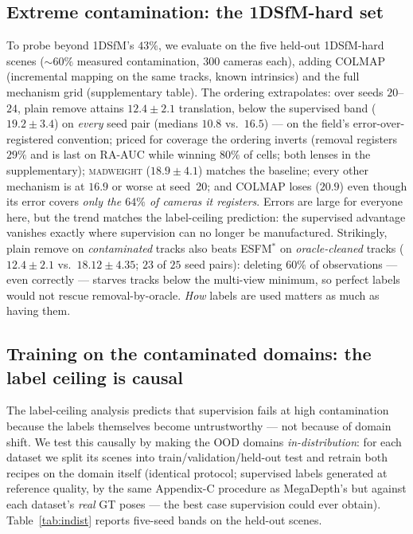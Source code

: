 \documentclass[10pt,twocolumn,letterpaper]{article}
\newcommand{\mad}{\textsc{madweight}}
\begin{document}
\subsection{Extreme contamination: the 1DSfM-hard set}\label{sec:extreme}
To probe beyond 1DSfM's $43\%$, we evaluate on the five held-out 1DSfM-hard scenes
($\sim\!60\%$ measured contamination, $300$ cameras each), adding COLMAP (incremental
mapping on the same tracks, known intrinsics) and the full mechanism grid
(supplementary table). The ordering extrapolates: over seeds
$20$--$24$, plain remove attains $12.4\pm2.1$ translation, below the supervised band
($19.2\pm3.4$) on \emph{every} seed pair (medians $10.8$ vs.\ $16.5$) --- on the
field's error-over-registered convention; priced for coverage the ordering inverts
(removal registers $29\%$ and is last on RA-AUC while winning $80\%$ of cells;
both lenses in the supplementary); \mad{}
($18.9\pm4.1$) matches the baseline; every other mechanism is at $16.9$ or worse at
seed~20; and COLMAP loses ($20.9$) even though its error covers \emph{only the $64\%$
of cameras it registers}. Errors are large for everyone here, but the trend matches the
label-ceiling prediction: the supervised advantage vanishes exactly where supervision
can no longer be manufactured. Strikingly, plain remove on \emph{contaminated} tracks
also beats ESFM$^{\ast}$ on \emph{oracle-cleaned} tracks ($12.4\pm2.1$ vs.\
$18.12\pm4.35$; $23$ of $25$ seed pairs): deleting $60\%$ of observations --- even
correctly --- starves tracks below the multi-view minimum, so perfect labels would not
rescue removal-by-oracle. \emph{How} labels are used matters as much as having them.

\subsection{Training on the contaminated domains: the label ceiling is causal}\label{sec:indist}
The label-ceiling analysis predicts that supervision fails at high contamination because
the labels themselves become untrustworthy --- not because of domain shift. We test this
causally by making the OOD domains \emph{in-distribution}: for each dataset we split its
scenes into train/validation/held-out test and retrain both recipes on the domain itself
(identical protocol; supervised labels generated at reference quality, by the same
Appendix-C procedure as MegaDepth's but against each dataset's \emph{real} GT poses ---
the best case supervision could ever obtain). Table~\ref{tab:indist} reports five-seed
bands on the held-out scenes.
\end{document}
